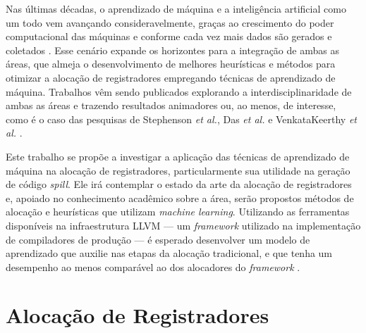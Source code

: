 \documentclass[
	12pt,				%
	openright,			%
	oneside,			%
	a4paper,			%
	tccpreliminar,			%
	]{ABNT-DC-UEL}
\begin{document}
Nas últimas décadas, o aprendizado de máquina e a inteligência artificial como um todo vem avançando consideravelmente, graças ao crescimento do poder computacional das máquinas e conforme cada vez mais dados são gerados e coletados \cite{alpaydin:20}. Esse cenário expande os horizontes para a integração de ambas as áreas, que almeja o desenvolvimento de melhores heurísticas e métodos para otimizar a alocação de registradores empregando técnicas de aprendizado de máquina. Trabalhos vêm sendo publicados explorando a interdisciplinaridade de ambas as áreas e trazendo resultados animadores ou, ao menos, de interesse, como é o caso das pesquisas de Stephenson \textit{et al.}, Das \textit{et al.} e VenkataKeerthy \textit{et al.} \cite{amarasinghe:03, das:20, venkatakeerthy:23}.

Este trabalho se propõe a investigar a aplicação das técnicas de aprendizado de máquina na alocação de registradores, particularmente sua utilidade na geração de código \textit{spill}. Ele irá contemplar o estado da arte da alocação de registradores e, apoiado no conhecimento acadêmico sobre a área, serão propostos métodos de alocação e heurísticas que utilizam \textit{machine learning}. Utilizando as ferramentas disponíveis na infraestrutura LLVM --- um \textit{framework} utilizado na implementação de compiladores de produção --- é esperado desenvolver um modelo de aprendizado que auxilie nas etapas da alocação tradicional, e que tenha um desempenho ao menos comparável ao dos alocadores do \textit{framework} \cite{llvm:01}.





% 

\chapter{Alocação de Registradores}
\end{document}
